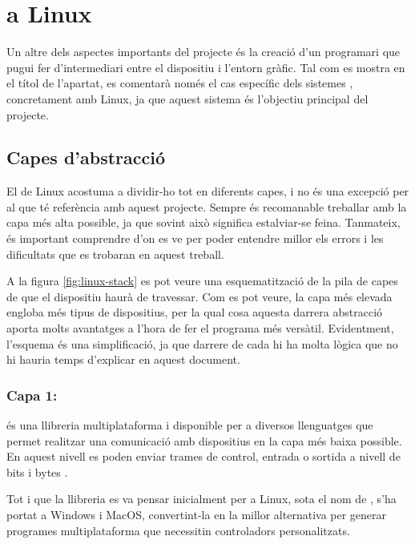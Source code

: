 \section{ a Linux}

Un altre dels aspectes importants del projecte és la creació d'un programari
que pugui fer d'intermediari entre el dispositiu i l'entorn gràfic. Tal com es
mostra en el títol de l'apartat, es comentarà només el cas específic dels sistemes
, concretament amb Linux, ja que aquest sistema és l'objectiu
principal del projecte.

\subsection{Capes d'abstracció}

El  de Linux acostuma a dividir-ho tot en diferents capes, i no és una
excepció per al que té referència amb aquest projecte. Sempre és recomanable
treballar amb la capa més alta possible, ja que sovint això significa
estalviar-se feina. Tanmateix, és important comprendre d'on es ve per
poder entendre millor els errors i les dificultats que es trobaran en aquest treball.

A la figura \ref{fig:linux-stack} es pot veure una esquematització de la pila
de capes de  que el dispositiu haurà de travessar. Com es pot
veure, la capa més elevada engloba més tipus de dispositius, per la qual cosa aquesta
darrera abstracció aporta molts avantatges a l'hora de fer el programa més
versàtil. Evidentment, l'esquema és una simplificació, ja que darrere de cada
 hi ha molta lògica que no hi hauria temps d'explicar en aquest
document.



\subsubsection*{Capa 1: }

 és una llibreria multiplataforma i disponible per a diversos
llenguatges que permet realitzar una comunicació amb dispositius  en
la capa més baixa possible. En aquest nivell es poden enviar trames de control,
entrada o sortida a nivell de bits i bytes \cite{Libusb}.

Tot i que la llibreria es va pensar inicialment per a Linux, sota el nom de
 \cite{LinuxUsb}, s'ha portat a Windows i MacOS,
convertint-la en la millor alternativa per generar programes multiplataforma
que necessitin controladors personalitzats.

